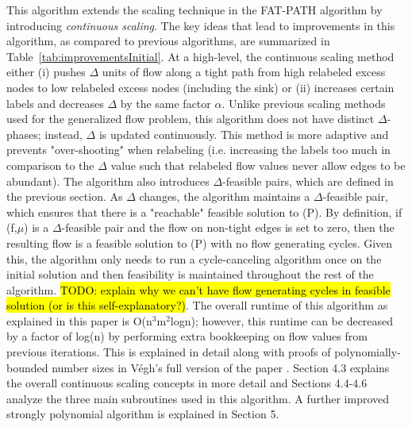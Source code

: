 \documentclass[11pt]{article}
\theoremstyle{definition}
\theoremstyle{definition}
\newcommand{\todo}[1]{\hl{TODO: #1}}
\begin{document}
	This algorithm extends the scaling technique in the FAT-PATH algorithm \cite{Goldberg:1991:CAG:105014.105022} by introducing \textit{continuous scaling}. The key ideas that lead to improvements in this algorithm, as compared to previous algorithms, are summarized in Table~\ref{tab:improvementsInitial}. At a high-level, the continuous scaling method either (i) pushes $\Delta$ units of flow along a tight path from high relabeled excess nodes to low relabeled excess nodes (including the sink) or (ii) increases certain labels and decreases $\Delta$ by the same factor $\alpha$. Unlike previous scaling methods used for the generalized flow problem, this algorithm does not have distinct $\Delta$-phases; instead, $\Delta$ is updated continuously. This method is more adaptive and prevents "over-shooting" when relabeling (i.e. increasing the labels too much in comparison to the $\Delta$ value such that relabeled flow values never allow edges to be abundant). The algorithm also introduces $\Delta$-feasible pairs, which are defined in the previous section. As $\Delta$ changes, the algorithm maintains a $\Delta$-feasible pair, which ensures that there is a "reachable" feasible solution to (P). By definition, if (f,$\mu$) is a $\Delta$-feasible pair and the flow on non-tight edges is set to zero, then the resulting flow is a feasible solution to (P) with no flow generating cycles. Given this, the algorithm only needs to run a cycle-canceling algorithm once on the initial solution and then feasibility is maintained throughout the rest of the algorithm. \todo{explain why we can't have flow generating cycles in feasible solution (or is this self-explanatory?)}. The overall runtime of this algorithm as explained in this paper is O(n$^3$m$^2$logn); however, this runtime can be decreased by a factor of log(n) by performing extra bookkeeping on flow values from previous iterations. This is explained in detail along with proofs of polynomially-bounded number sizes in Végh's full version of the paper \cite{article}. Section 4.3 explains the overall continuous scaling concepts in more detail and Sections 4.4-4.6 analyze the three main subroutines used in this algorithm. A further improved strongly polynomial algorithm is explained in Section 5.
	 
\end{document}
